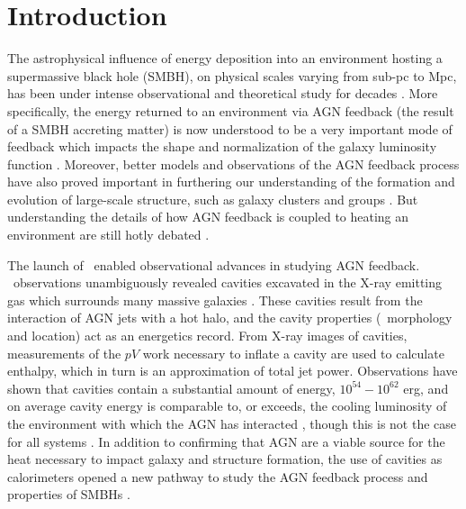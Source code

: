 \documentclass{emulateapj}
\begin{document}

\section{Introduction}
\label{sec:intro}

The astrophysical influence of energy deposition into an environment
hosting a supermassive black hole (SMBH), on physical scales varying
from sub-pc to Mpc, has been under intense observational and
theoretical study for decades \citep[\eg][]{1969Natur.223..690L,
  1974MNRAS.166..513S, cowie77, 1981ApJ...248...55B,
  1982MNRAS.200..115S, 1984ARA&A..22..471R, burns90,
  1993MNRAS.263..323T, 1997MNRAS.288..355B, magorrian,
  1999MNRAS.303..188K, 2000ApJ...534L.135M, best05, haradent}. More
specifically, the energy returned to an environment via AGN feedback
(the result of a SMBH accreting matter) is now understood to be a very
important mode of feedback which impacts the shape and normalization
of the galaxy luminosity function \citep{croton06, bower06, saro06,
  sijacki07}. Moreover, better models and observations of the AGN
feedback process have also proved important in furthering our
understanding of the formation and evolution of large-scale structure,
such as galaxy clusters and groups \citep[see, for
  example,][]{2008MNRAS.386.1309M, minggroups}. But understanding the
details of how AGN feedback is coupled to heating an environment are
still hotly debated \citep[\eg][]{2008ASPC..386..343D}.

The launch of \chandra\ enabled observational advances in studying AGN
feedback. \chandra\ observations unambiguously revealed cavities
excavated in the X-ray emitting gas which surrounds many massive
galaxies \citep[\eg][]{2000ApJ...534L.135M, perseus1,
  schindler01}. These cavities result from the interaction of AGN jets
with a hot halo, and the cavity properties (\ie\ morphology and
location) act as an energetics record. From X-ray images of cavities,
measurements of the $pV$ work necessary to inflate a cavity are used
to calculate enthalpy, which in turn is an approximation of total jet
power. Observations have shown that cavities contain a substantial
amount of energy, $10^{54}-10^{62}$ erg, and on average cavity energy
is comparable to, or exceeds, the cooling luminosity of the
environment with which the AGN has interacted \citep{birzan04,
  rafferty06}, though this is not the case for all systems
\citep{dunn08}. In addition to confirming that AGN are a viable source
for the heat necessary to impact galaxy and structure formation, the
use of cavities as calorimeters opened a new pathway to study the AGN
feedback process and properties of SMBHs \citep{2009ApJ...698..594M}.
\end{document}
